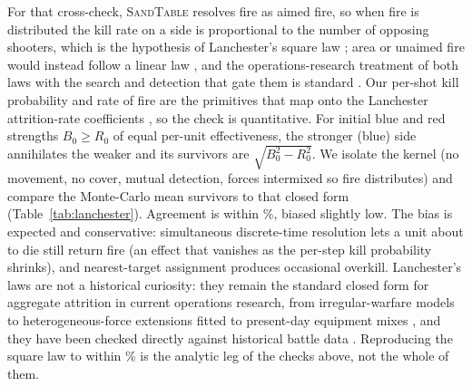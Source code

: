 \documentclass[11pt]{article}
\newcommand{\sandtable}{\textsc{SandTable}}
\begin{document}
For that cross-check, \sandtable{} resolves fire as aimed fire, so when fire is distributed the kill rate on a side is proportional to the number of opposing shooters, which is the hypothesis of Lanchester's square law \citep{lanchester1916aircraft}; area or unaimed fire would instead follow a linear law \citep{deitchman1962guerrilla}, and the operations-research treatment of both laws with the search and detection that gate them is standard \citep{washburn2009combat}. Our per-shot kill probability and rate of fire are the primitives that map onto the Lanchester attrition-rate coefficients \citep{bonder1967attrition}, so the check is quantitative. For initial blue and red strengths $B_0 \ge R_0$ of equal per-unit effectiveness, the stronger (blue) side annihilates the weaker and its survivors are $\sqrt{B_0^2 - R_0^2}$. We isolate the kernel (no movement, no cover, mutual detection, forces intermixed so fire distributes) and compare the Monte-Carlo mean survivors to that closed form (Table~\ref{tab:lanchester}). Agreement is within \lanchMaxErr\%, biased slightly low. The bias is expected and conservative: simultaneous discrete-time resolution lets a unit about to die still return fire (an effect that vanishes as the per-step kill probability shrinks), and nearest-target assignment produces occasional overkill. Lanchester's laws are not a historical curiosity: they remain the standard closed form for aggregate attrition in current operations research, from irregular-warfare models \citep{kress2020lanchester} to heterogeneous-force extensions fitted to present-day equipment mixes \citep{hausken2025modeling}, and they have been checked directly against historical battle data \citep{lucas2004fitting}. Reproducing the square law to within \lanchMaxErr\% is the analytic leg of the checks above, not the whole of them.

\begin{table}[H]
\centering
\caption{Attrition kernel versus Lanchester's square law. Mean surviving stronger-side units over 600 replications per duel; ``square law'' is $\sqrt{B_0^2-R_0^2}$.}
\label{tab:lanchester}

\end{table}
\end{document}

